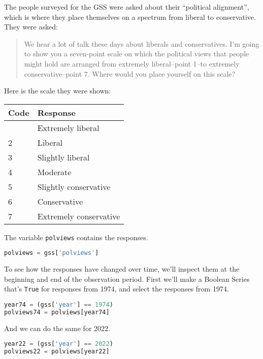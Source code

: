 The people surveyed for the GSS were asked about their ``political
alignment'', which is where they place themselves on a spectrum from
liberal to conservative. They were asked:

\begin{quote}
We hear a lot of talk these days about liberals and conservatives. I'm
going to show you a seven-point scale on which the political views that
people might hold are arranged from extremely liberal--point 1--to
extremely conservative--point 7. Where would you place yourself on this
scale?
\end{quote}

Here is the scale they were shown:

\begin{longtable}[]{ll}
\toprule
Code & Response \\
\midrule
\endhead
\bottomrule
\endlastfoot
1 & Extremely liberal \\
2 & Liberal \\
3 & Slightly liberal \\
4 & Moderate \\
5 & Slightly conservative \\
6 & Conservative \\
7 & Extremely conservative \\
\end{longtable}

The variable \passthrough{\lstinline!polviews!} contains the responses.

\begin{lstlisting}[language=Python,style=source]
polviews = gss['polviews']
\end{lstlisting}

To see how the responses have changed over time, we'll inspect them at
the beginning and end of the observation period. First we'll make a
Boolean Series that's \passthrough{\lstinline!True!} for responses from
1974, and select the responses from 1974.

\begin{lstlisting}[language=Python,style=source]
year74 = (gss['year'] == 1974)
polviews74 = polviews[year74]
\end{lstlisting}

And we can do the same for 2022.

\begin{lstlisting}[language=Python,style=source]
year22 = (gss['year'] == 2022)
polviews22 = polviews[year22]
\end{lstlisting}

